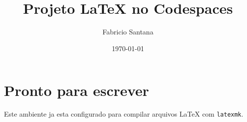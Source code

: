 \documentclass[a4paper,12pt]{article}
\title{Projeto LaTeX no Codespaces}
\author{Fabricio Santana}
\date{\today}
\begin{document}
\maketitle

\section{Pronto para escrever}

Este ambiente ja esta configurado para compilar arquivos \LaTeX{} com \texttt{latexmk}.
\end{document}
